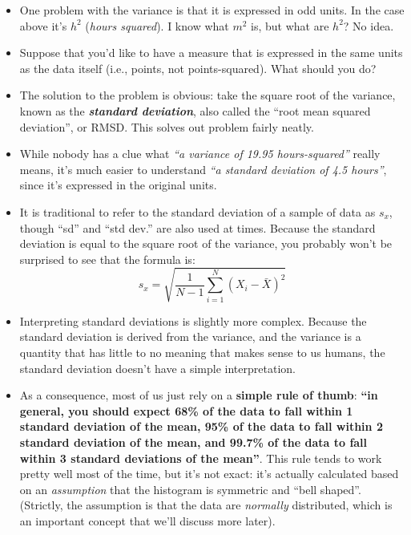\documentclass[
]{book}
\begin{document}
\begin{itemize}
\item
  One problem with the variance is that it is expressed in odd units. In the case above it's \(h^2\) (\emph{hours squared}). I know what \(m^2\) is, but what are \(h^2\)? No idea.
\item
  Suppose that you'd like to have a measure that is expressed in the same units as the data itself (i.e., points, not points-squared). What should you do?
\item
  The solution to the problem is obvious: take the square root of the variance, known as the \textbf{\emph{standard deviation}}, also called the ``root mean squared deviation'', or RMSD. This solves out problem fairly neatly.
\item
  While nobody has a clue what \emph{``a variance of 19.95 hours-squared''} really means, it's much easier to understand \emph{``a standard deviation of 4.5 hours''}, since it's expressed in the original units.
\item
  It is traditional to refer to the standard deviation of a sample of data as \(s_x\), though ``sd'' and ``std dev.'' are also used at times. Because the standard deviation is equal to the square root of the variance, you probably won't be surprised to see that the formula is:
  \[
  s_x = \sqrt{ \frac{1}{N-1} \sum_{i=1}^N \left( X_i - \bar{X} \right)^2 }
  \]
\item
  Interpreting standard deviations is slightly more complex. Because the standard deviation is derived from the variance, and the variance is a quantity that has little to no meaning that makes sense to us humans, the standard deviation doesn't have a simple interpretation.
\item
  As a consequence, most of us just rely on a \textbf{simple rule of thumb}: \textbf{``in general, you should expect 68\% of the data to fall within 1 standard deviation of the mean, 95\% of the data to fall within 2 standard deviation of the mean, and 99.7\% of the data to fall within 3 standard deviations of the mean''}. This rule tends to work pretty well most of the time, but it's not exact: it's actually calculated based on an \emph{assumption} that the histogram is symmetric and ``bell shaped''. (Strictly, the assumption is that the data are \emph{normally} distributed, which is an important concept that we'll discuss more later).
\end{itemize}
\end{document}
